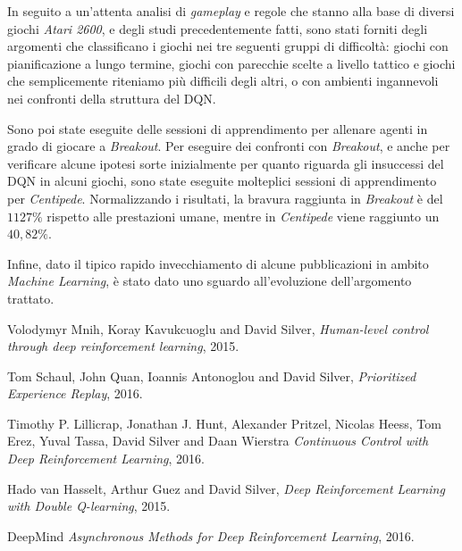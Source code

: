 \documentclass[twoside,twocolumn,10pt]{extarticle}
\theoremstyle{definition}
\begin{document}
		In seguito a un'attenta analisi di \textit{gameplay} e regole che stanno alla base di diversi giochi \textit{Atari 2600}, e degli studi precedentemente fatti, sono stati forniti degli argomenti che classificano i giochi nei tre seguenti gruppi di difficoltà: giochi con pianificazione a lungo termine, giochi con parecchie scelte a livello tattico e giochi che semplicemente riteniamo più difficili degli altri, o con ambienti ingannevoli nei confronti della struttura del DQN.
		
		Sono poi state eseguite delle sessioni di apprendimento per allenare agenti in grado di giocare a \textit{Breakout}. Per eseguire dei confronti con \textit{Breakout}, e anche per verificare alcune ipotesi sorte inizialmente per quanto riguarda gli insuccessi del DQN in alcuni giochi, sono state eseguite molteplici sessioni di apprendimento per \textit{Centipede}. Normalizzando i risultati, la bravura raggiunta in \textit{Breakout} è del $1127\%$ rispetto alle prestazioni umane, mentre in \textit{Centipede} viene raggiunto un $40,82\%$.
		
		Infine, dato il tipico rapido invecchiamento di alcune pubblicazioni in ambito \textit{Machine Learning}, è stato dato uno sguardo all'evoluzione dell'argomento trattato.
	
\begin{thebibliography}{99}	
		Volodymyr Mnih, Koray Kavukcuoglu and David Silver,
		\newblock \emph{Human-level control through deep reinforcement learning},
		2015.
		
		Tom Schaul, John Quan, Ioannis Antonoglou and David Silver,
		\newblock \emph{Prioritized Experience Replay},
		2016.
		
		Timothy P. Lillicrap, Jonathan J. Hunt, Alexander Pritzel, Nicolas Heess,
Tom Erez, Yuval Tassa, David Silver and Daan Wierstra
		\newblock \emph{Continuous Control with Deep Reinforcement Learning},
		2016.
		
		Hado van Hasselt, Arthur Guez and David Silver,
		\newblock \emph{Deep Reinforcement Learning with Double Q-learning},
		2015.
	
		DeepMind
		\newblock \emph{Asynchronous Methods for Deep Reinforcement Learning},
		2016.
\end{thebibliography}
\end{document}
